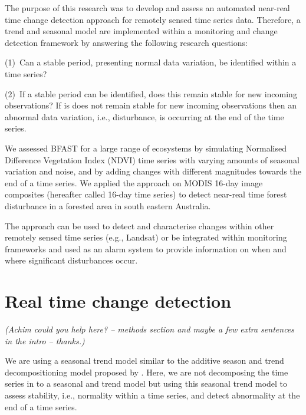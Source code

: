 \documentclass[authoryear,preprint,review,10pt]{elsarticle}
\newcommand{\fixme}[1]{\emph{\marginpar{FIXME} (#1)}}
\begin{document}

The purpose of this research was to develop and assess an automated near-real
time change detection approach for remotely sensed time series data.  Therefore,
a trend and seasonal model are implemented within a monitoring and change detection framework by answering the
following research questions:

(1)~Can a stable period, presenting normal data variation, be identified within
a time series?


(2)~If a stable period can be identified, does this remain stable for new
incoming observations? If is does not remain stable for new incoming
observations then an abnormal data variation, i.e., disturbance, is occurring at
the end of the time series. 

We assessed BFAST for a large range of ecosystems by simulating Normalised
Difference Vegetation Index (NDVI) time series with varying amounts of seasonal
variation and noise, and by adding changes with different magnitudes towards the
end of a time series. We applied the approach on MODIS 16-day image composites
(hereafter called 16-day time series) to detect near-real time forest
disturbance in a forested area in south eastern Australia. 

The approach can be used to detect and characterise changes within other
remotely sensed time series (e.g., Landsat) or be integrated within monitoring
frameworks and used as an alarm system to provide information on when and where
significant disturbances occur.

\section{Real time change detection}\label{sec:Method}

\fixme{Achim could you help here? -- methods section and maybe a few extra
sentences in the intro -- thanks.}

We are using a seasonal trend model similar to the additive season and trend
decompositioning model proposed by \citet{Verbesselt:2010wo}. Here, we are not
decomposing the time series in to a seasonal and trend model but using this
seasonal trend model to assess stability, i.e., normality within a time series,
and detect abnormality at the end of a time series.
\end{document}
